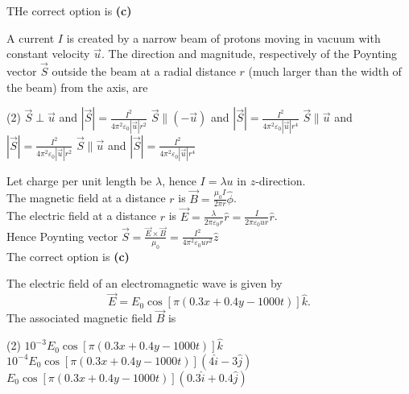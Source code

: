 \begin{enumerate}
\begin{tasks}
\end{tasks}
\begin{answer}
	THe correct option is \textbf{(c)}	
\end{answer}
\begin{minipage}{\textwidth}
	\item A current $I$ is created by a narrow beam of protons moving in vacuum with constant velocity $\vec{u}$. The direction and magnitude, respectively of the Poynting vector $\vec{S}$ outside the beam at a radial distance $r$ (much larger than the width of the beam) from the axis, are
\end{minipage}
\begin{tasks}(2)
	\task[\textbf{A.}] $\vec{S} \perp \vec{u}$ and $|\vec{S}|=\frac{I^{2}}{4 \pi^{2} \varepsilon_{0}|\vec{u}| r^{2}}$
	\task[\textbf{B.}]$\vec{S} \|(-\vec{u})$ and $|\vec{S}|=\frac{I^{2}}{4 \pi^{2} \varepsilon_{0}|\vec{u}| r^{4}}$
	\task[\textbf{C.}]$\vec{S} \| \vec{u}$ and $|\vec{S}|=\frac{I^{2}}{4 \pi^{2} \varepsilon_{0}|\vec{u}| r^{2}}$
	\task[\textbf{D.}]$\vec{S} \| \vec{u}$ and $|\vec{S}|=\frac{I^{2}}{4 \pi^{2} \varepsilon_{0}|\vec{u}| r^{4}}$
\end{tasks}
\begin{answer}
	Let charge per unit length be $\lambda$, hence $I=\lambda u$ in $z$-direction.\\
	The magnetic field at a distance $r$ is $\vec{B}=\frac{\mu_{0} I}{2 \pi r} \hat{\phi}$.\\
	The electric field at a distance $r$ is $\vec{E}=\frac{\lambda}{2 \pi \varepsilon_{0} r} \hat{r}=\frac{I}{2 \pi \varepsilon_{0} u r} \hat{r}$.\\
	Hence Poynting vector $\vec{S}=\frac{\vec{E} \times \vec{B}}{\mu_{0}}=\frac{I^{2}}{4 \pi^{2} \varepsilon_{0} u r^{2}} \hat{z}$\\
	The correct option is \textbf{(c)}	
\end{answer}
\begin{minipage}{\textwidth}
	\item The electric field of an electromagnetic wave is given by
	$$
	\vec{E}=E_{0} \cos [\pi(0.3 x+0.4 y-1000 t)] \hat{k} .
	$$
	The associated magnetic field $\vec{B}$ is
\end{minipage}
\begin{tasks}(2)
	\task[\textbf{A.}] $10^{-3} E_{0} \cos [\pi(0.3 x+0.4 y-1000 t)] \hat{k}$
	\task[\textbf{B.}]$10^{-4} E_{0} \cos [\pi(0.3 x+0.4 y-1000 t)](4 \hat{i}-3 \hat{j})$
	\task[\textbf{C.}]$E_{0} \cos [\pi(0.3 x+0.4 y-1000 t)](0.3 \hat{i}+0.4 \hat{j})$

\end{tasks}
\end{enumerate}
